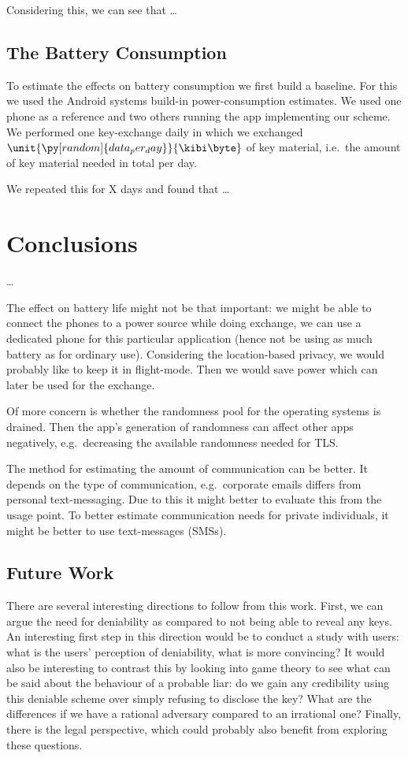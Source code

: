 Considering this, we can see that \dots

\subsection{The Battery Consumption}
\label{sec:Battery}
To estimate the effects on battery consumption we first build a baseline.
For this we used the Android systems build-in power-consumption estimates.
We used one phone as a reference and two others running the app implementing 
our scheme.
We performed one key-exchange daily in which we exchanged 
\(\unit{\py[random]{data_per_day}}{\kibi\byte}\) of key material, i.e.~the 
amount of key material needed in total per day.

We repeated this for X days and found that \dots


\section{Conclusions}
\label{sec:Conclusions}

\dots

The effect on battery life might not be that important: we might be able to 
connect the phones to a power source while doing exchange, we can use 
a dedicated phone for this particular application (hence not be using as much 
battery as for ordinary use).
Considering the location-based privacy, we would probably like to keep it in 
flight-mode.
Then we would save power which can later be used for the exchange.

Of more concern is whether the randomness pool for the operating systems is 
drained.
Then the app's generation of randomness can affect other apps negatively, 
e.g.~decreasing the available randomness needed for TLS\@.

The method for estimating the amount of communication can be better.
It depends on the type of communication, e.g.~corporate emails differs from 
personal text-messaging.
Due to this it might better to evaluate this from the usage point.
To better estimate communication needs for private individuals, it might be 
better to use text-messages (SMSs).

\subsection{Future Work}

There are several interesting directions to follow from this work.
First, we can argue the need for deniability as compared to not being able to 
reveal any keys.
An interesting first step in this direction would be to conduct a study with 
users: what is the users' perception of deniability, what is more convincing?
It would also be interesting to contrast this by looking into game theory to 
see what can be said about the behaviour of a probable liar: do we gain any 
credibility using this deniable scheme over simply refusing to disclose the 
key?
What are the differences if we have a rational adversary compared to an 
irrational one?
Finally, there is the legal perspective, which could probably also benefit from 
exploring these questions.

